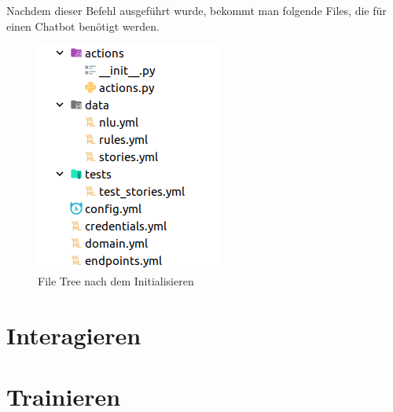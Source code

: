Nachdem dieser Befehl ausgeführt wurde, bekommt man folgende Files, die für einen Chatbot benötigt werden.

\begin{figure}[hbt!]
  \centering
  \includegraphics[scale=0.25]{pics/rasa_file_tree}
  \caption{File Tree nach dem Initialisieren}
  \label{fig:file_tree}
\end{figure}

\section{Interagieren}

\section{Trainieren}
